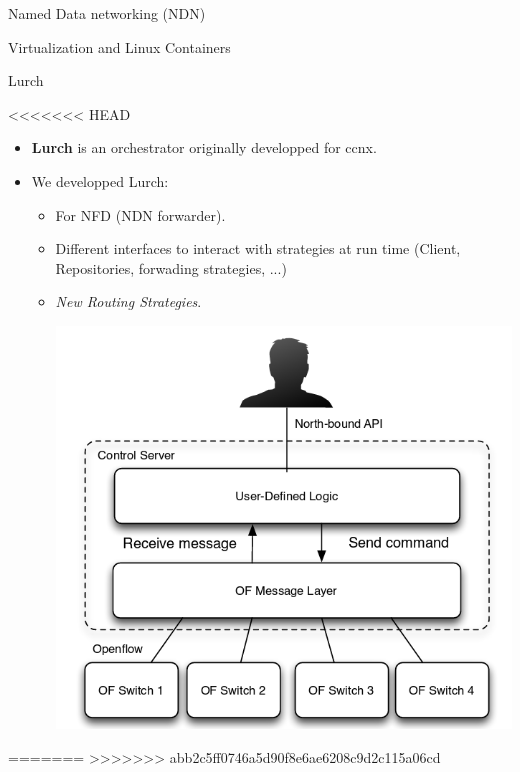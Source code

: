 \documentclass[8pt]{beamer}
\newcommand{\1}{\mathbbm 1}
\begin{document}
\begin{frame}{Named Data networking (NDN)}
\begin{frame}{Virtualization and Linux Containers}
{}

\end{frame}

\begin{frame}{Lurch}

<<<<<<< HEAD
\begin{itemize}
\item \textbf{Lurch} is an orchestrator originally developped for ccnx. 
\item We developped Lurch:

\begin{itemize}
\item For NFD (NDN forwarder).
\item Different interfaces to interact with strategies at run time (Client, Repositories, forwading strategies, ...)
\item \textit{New Routing Strategies}.



\begin{center}
\includegraphics[scale=0.25]{figures/controller.png}
\end{center}


\end{itemize}
\end{itemize} 



=======
>>>>>>> abb2c5ff0746a5d90f8e6ae6208c9d2c115a06cd

\end{frame}



\end{frame}
\end{document}
